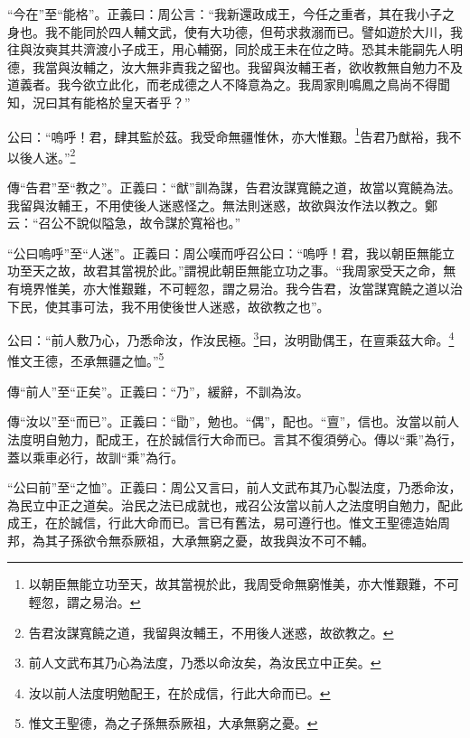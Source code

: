 {\noindent\shu{}\fzkt “今在”至“能格”。正義曰：周公言：“我新還政成王，今任之重者，其在我小子之身也。我不能同於四人輔文武，使有大功德，但苟求救溺而已。譬如遊於大川，我往與汝奭其共濟渡小子成王，用心輔弼，同於成王未在位之時。恐其未能嗣先人明德，我當與汝輔之，汝大無非責我之留也。我留與汝輔王者，欲收教無自勉力不及道義者。我今欲立此化，而老成德之人不降意為之。我周家則鳴鳳之鳥尚不得聞知，況曰其有能格於皇天者乎？” \par}

公曰：“嗚呼！君，肆其監於茲。我受命無疆惟休，亦大惟艱。\footnote{以朝臣無能立功至天，故其當視於此，我周受命無窮惟美，亦大惟艱難，不可輕忽，謂之易治。}告君乃猷裕，我不以後人迷。”\footnote{告君汝謀寬饒之道，我留與汝輔王，不用後人迷惑，故欲教之。}


{\noindent\zhuan{}\fzbyks 傳“告君”至“教之”。正義曰：“猷”訓為謀，告君汝謀寬饒之道，故當以寬饒為法。我留與汝輔王，不用使後人迷惑怪之。無法則迷惑，故欲與汝作法以教之。鄭云：“召公不說似隘急，故令謀於寬裕也。” \par}

{\noindent\shu{}\fzkt “公曰嗚呼”至“人迷”。正義曰：周公嘆而呼召公曰：“嗚呼！君，我以朝臣無能立功至天之故，故君其當視於此。”謂視此朝臣無能立功之事。“我周家受天之命，無有境界惟美，亦大惟艱難，不可輕忽，謂之易治。我今告君，汝當謀寬饒之道以治下民，使其事可法，我不用使後世人迷惑，故欲教之也”。 \par}

公曰：“前人敷乃心，乃悉命汝，作汝民極。\footnote{前人文武布其乃心為法度，乃悉以命汝矣，為汝民立中正矣。}曰，汝明勖偶王，在亶乘茲大命。\footnote{汝以前人法度明勉配王，在於成信，行此大命而已。}惟文王德，丕承無疆之恤。”\footnote{惟文王聖德，為之子孫無忝厥祖，大承無窮之憂。}


{\noindent\zhuan{}\fzbyks 傳“前人”至“正矣”。正義曰：“乃”，緩辭，不訓為汝。 \par}

{\noindent\zhuan{}\fzbyks 傳“汝以”至“而已”。正義曰：“勖”，勉也。“偶”，配也。“亶”，信也。汝當以前人法度明自勉力，配成王，在於誠信行大命而已。言其不復須勞心。傳以“乘”為行，蓋以乘車必行，故訓“乘”為行。 \par}

{\noindent\shu{}\fzkt “公曰前”至“之恤”。正義曰：周公又言曰，前人文武布其乃心製法度，乃悉命汝，為民立中正之道矣。治民之法已成就也，戒召公汝當以前人之法度明自勉力，配此成王，在於誠信，行此大命而已。言已有舊法，易可遵行也。惟文王聖德造始周邦，為其子孫欲令無忝厥祖，大承無窮之憂，故我與汝不可不輔。 \par}


